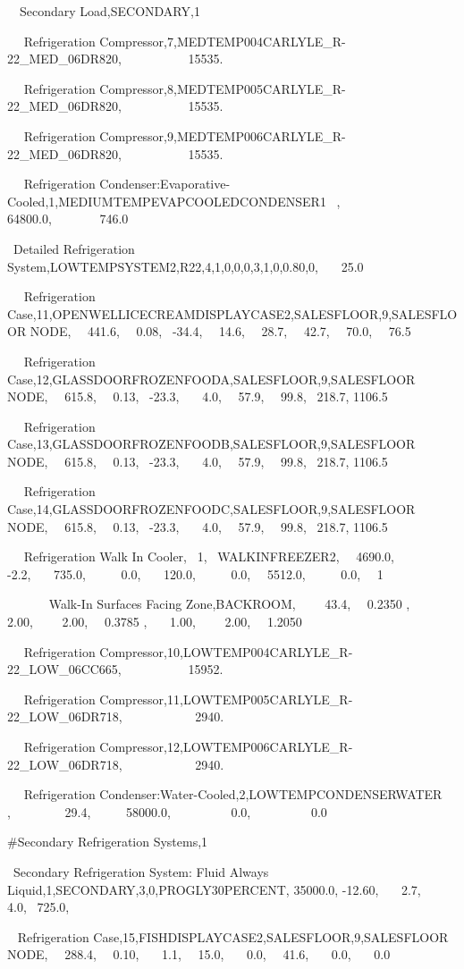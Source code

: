 ~~Secondary Load,SECONDARY,1

~~ Refrigeration Compressor,7,MEDTEMP004CARLYLE\_R-22\_MED\_06DR820,~~~~~~~~~~ 15535.

~~ Refrigeration Compressor,8,MEDTEMP005CARLYLE\_R-22\_MED\_06DR820,~~~~~~~~~~ 15535.

~~ Refrigeration Compressor,9,MEDTEMP006CARLYLE\_R-22\_MED\_06DR820,~~~~~~~~~~ 15535.

~~ Refrigeration Condenser:Evaporative-Cooled,1,MEDIUMTEMPEVAPCOOLEDCONDENSER1~ ,~~~~~ 64800.0,~~~~~~~ 746.0

~Detailed Refrigeration System,LOWTEMPSYSTEM2,R22,4,1,0,0,0,3,1,0,0.80,0,~~~ 25.0

~~ Refrigeration Case,11,OPENWELLICECREAMDISPLAYCASE2,SALESFLOOR,9,SALESFLOOR NODE,~~ 441.6,~~ 0.08,~ -34.4,~~ 14.6,~~ 28.7,~~ 42.7,~~ 70.0,~~ 76.5

~~ Refrigeration Case,12,GLASSDOORFROZENFOODA,SALESFLOOR,9,SALESFLOOR NODE,~~ 615.8,~~ 0.13,~ -23.3,~~~ 4.0,~~ 57.9,~~ 99.8,~ 218.7, 1106.5

~~ Refrigeration Case,13,GLASSDOORFROZENFOODB,SALESFLOOR,9,SALESFLOOR NODE,~~ 615.8,~~ 0.13,~ -23.3,~~~ 4.0,~~ 57.9,~~ 99.8,~ 218.7, 1106.5

~~ Refrigeration Case,14,GLASSDOORFROZENFOODC,SALESFLOOR,9,SALESFLOOR NODE,~~ 615.8,~~ 0.13,~ -23.3,~~~ 4.0,~~ 57.9,~~ 99.8,~ 218.7, 1106.5

~~ Refrigeration Walk In Cooler,~ 1,~ WALKINFREEZER2,~~ 4690.0,~~~~ -2.2,~~~ 735.0,~~~~~ 0.0,~~~ 120.0,~~~~~ 0.0,~~ 5512.0,~~~~~ 0.0,~~ 1

~~~~~~ Walk-In Surfaces Facing Zone,BACKROOM,~~~~ 43.4,~~ 0.2350 ,~~~ 2.00,~~~~ 2.00,~~ 0.3785 ,~~~ 1.00,~~~~ 2.00,~~ 1.2050

~~ Refrigeration Compressor,10,LOWTEMP004CARLYLE\_R-22\_LOW\_06CC665,~~~~~~~~~~ 15952.

~~ Refrigeration Compressor,11,LOWTEMP005CARLYLE\_R-22\_LOW\_06DR718,~~~~~~~~~~~ 2940.

~~ Refrigeration Compressor,12,LOWTEMP006CARLYLE\_R-22\_LOW\_06DR718,~~~~~~~~~~~ 2940.

~~ Refrigeration Condenser:Water-Cooled,2,LOWTEMPCONDENSERWATER~ ,~~~~~~~~ 29.4,~~~~~ 58000.0,~~~~~~~~~ 0.0,~~~~~~~~~ 0.0

\#Secondary Refrigeration Systems,1

~Secondary Refrigeration System: Fluid Always Liquid,1,SECONDARY,3,0,PROGLY30PERCENT, 35000.0, -12.60,~~~ 2.7,~~~ 4.0,~ 725.0,

~ Refrigeration Case,15,FISHDISPLAYCASE2,SALESFLOOR,9,SALESFLOOR NODE,~~ 288.4,~~ 0.10,~~~ 1.1,~~ 15.0,~~~ 0.0,~~ 41.6,~~~ 0.0,~~~ 0.0

